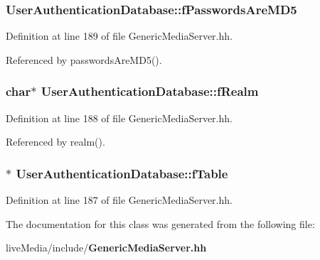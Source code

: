 \subsubsection[{f\+Passwords\+Are\+M\+D5}]{ User\+Authentication\+Database\+::f\+Passwords\+Are\+M\+D5\hspace{0.3cm}{\ttfamily [protected]}}\label{classUserAuthenticationDatabase_a6603756a3a25c5486dd20f62b2036a5f}


Definition at line 189 of file Generic\+Media\+Server.\+hh.



Referenced by passwords\+Are\+M\+D5().

\subsubsection[{f\+Realm}]{\setlength{\rightskip}{0pt plus 5cm}char$\ast$ User\+Authentication\+Database\+::f\+Realm\hspace{0.3cm}{\ttfamily [protected]}}\label{classUserAuthenticationDatabase_a1fc887c501542a0135662fb1603fc3ed}


Definition at line 188 of file Generic\+Media\+Server.\+hh.



Referenced by realm().

\subsubsection[{f\+Table}]{$\ast$ User\+Authentication\+Database\+::f\+Table\hspace{0.3cm}{\ttfamily [protected]}}\label{classUserAuthenticationDatabase_a7a4da7529537c7cdf9f373331f320c60}


Definition at line 187 of file Generic\+Media\+Server.\+hh.



The documentation for this class was generated from the following file\+:\begin{DoxyCompactItemize}
\item 
live\+Media/include/{\bf Generic\+Media\+Server.\+hh}\end{DoxyCompactItemize}

